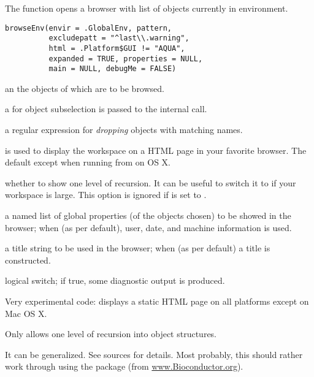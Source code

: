 %
\begin{Description}\relax
The  function opens a browser with list of objects
currently in  environment.
\end{Description}
%
\begin{Usage}
\begin{verbatim}
browseEnv(envir = .GlobalEnv, pattern,
          excludepatt = "^last\\.warning",
          html = .Platform$GUI != "AQUA",
          expanded = TRUE, properties = NULL,
          main = NULL, debugMe = FALSE)
\end{verbatim}
\end{Usage}
%
\begin{Arguments}
\begin{ldescription}
\item[\code{envir}] an  the objects of which are to
be browsed.
\item[\code{pattern}] a  for object subselection
is passed to the internal  call.
\item[\code{excludepatt}] a regular expression for \emph{dropping} objects
with matching names.
\item[\code{html}] is used to display the workspace
on a HTML page in your favorite browser.  The default except when
running from  on OS X.
\item[\code{expanded}] whether to show one level of recursion.  It can be useful
to switch it to  if your workspace is large.  This
option is ignored if  is set to .
\item[\code{properties}] a named list of global properties (of the objects chosen)
to be showed in the browser;  when  (as per default),
user, date, and machine information is used.
\item[\code{main}] a title string to be used in the browser; when 
(as per default) a title is constructed.
\item[\code{debugMe}] logical switch; if true, some diagnostic output is produced.
\end{ldescription}
\end{Arguments}
%
\begin{Details}\relax
Very experimental code: displays a static HTML page on all platforms
except  on Mac OS X.

Only allows one level of recursion into object structures.

It can be generalized.  See sources for details.
Most probably, this should rather work through using the 
package (from \url{www.Bioconductor.org}).
\end{Details}
